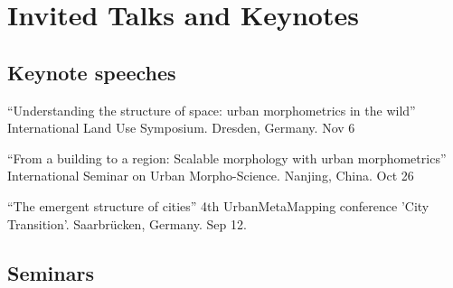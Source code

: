 \documentclass[12pt,a4paper]{report}
\begin{document}
    \section*{Invited Talks and Keynotes}

    \subsection*{Keynote speeches}

    \begin{tablist}

        \item[2025] \tab{}\enquote{Understanding the structure of space: urban morphometrics in the wild} International Land Use Symposium. Dresden, Germany. Nov 6
        \item[2024] \tab{}\enquote{From a building to a region: Scalable morphology with urban morphometrics} International Seminar on Urban Morpho-Science. Nanjing, China. Oct 26
        \item[2024] \tab{}\enquote{The emergent structure of cities} 4th UrbanMetaMapping conference 'City Transition'. Saarbrücken, Germany. Sep 12.

    \end{tablist}

    \subsection*{Seminars}
\end{document}

